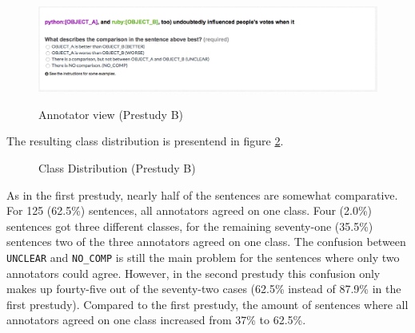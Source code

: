 \begin{figure}[h]
\centering
\includegraphics[width=1\textwidth]{images/prestudy/2_question}
\label{img:2_question}
\caption{Annotator view (Prestudy B)}
\end{figure}

The resulting class distribution is presentend in figure \ref{fig:dist_pre_b}. 

\begin{figure}[h]
\centering
\caption{Class Distribution (Prestudy B)}
\label{fig:dist_pre_b}
\end{figure}

As in the first prestudy, nearly half of the sentences are somewhat comparative. For 125 (62.5\%) sentences, all annotators agreed on one class. Four (2.0\%) sentences got three different classes, for the remaining seventy-one (35.5\%) sentences two of the three annotators agreed on one class. The confusion between \texttt{UNCLEAR} and \texttt{NO\_COMP} is still the main problem for the sentences where only two annotators could agree. However, in the second prestudy this confusion only makes up fourty-five out of the seventy-two cases (62.5\% instead of 87.9\% in the first prestudy). Compared to the first prestudy, the amount of sentences where all annotators agreed on one class increased from 37\% to 62.5\%. 

